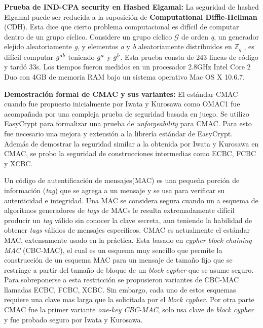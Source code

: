 \documentclass[runningheads]{llncs}
\begin{document}
\textbf{Prueba de \textbf{IND-CPA security} en Hashed Elgamal\cite{ref_article5}:}
La seguridad de hashed Elgamal puede ser reducida a la suposición de \textbf{Computational Diffie-Hellman} (CDH). Esta dice que cierto problema computacional es difícil de computar dentro de un grupo cíclico. Considere un grupo cíclico $\mathcal{G}$ de orden \textit{q}, un generador elejido aleatoriamente \textit{g}, y elementos \textit{a} y \textit{b} aleatoriamente distribuidos en $\mathbb{Z}_q$ , es difícil computar $\mathnormal{g^{ab}}$ teniendo $\mathnormal{g^{a}}$ y $\mathnormal{g^{b}}$. Esta prueba consta de 243 lineas de código y tardó 33s. Los tiempos fueron medidos en un procesador 2.8GHz Intel Core 2 Duo con 4GB de memoria RAM bajo un sistema operativo Mac OS X 10.6.7.



\textbf{Demostración formal de CMAC y sus variantes\cite{ref_article6}:}
El estándar CMAC cuando fue propuesto inicialmente por Iwata y Kurosawa como OMAC1 fue acompañada por una compleja prueba de seguridad basada en juego. Se utilizo EasyCrypt para formalizar una prueba de \textit{unforgeability} para CMAC. Para esto fue necesario una mejora y extensión a la librería estándar de EasyCrypt. Además de demostrar la seguridad similar a la obtenida por Iwata y Kurosawa\cite{ref_article7} en CMAC, se probo la seguridad de construcciones intermedias como ECBC, FCBC y XCBC\cite{ref_article8}.

Un código de autentificación de mensajes(MAC) es una pequeña porción de información (\textit{tag}) que se agrega a un mensaje y se usa para verificar su autenticidad e integridad. Una MAC se considera segura cuando un a esquema de algoritmos generadores de \textit{tags} de MACs le resulta extremadamente difícil producir un \textit{tag} válido sin conocer la clave secreta, aun teniendo la habilidad de obtener \textit{tags} válidos de mensajes específicos. CMAC es actualmente el estándar MAC, extensamente usado en la práctica. Esta basado en \textit{cypher block chaining MAC} (CBC-MAC), el cual es un esquema muy sencillo que permite la construcción de un esquema MAC para un mensaje de tamaño fijo que se restringe a partir del tamaño de bloque de un \textit{block cypher} que se asume seguro. Para sobreponerse a esta restricción se propusieron variantes de CBC-MAC llamadas ECBC, FCBC, XCBC. Sin embargo, cada uno de estos esquemas requiere una clave mas larga que la solicitada por el \textit{block cypher}. Por otra parte CMAC fue la primer variante \textit{one-key CBC-MAC}, solo usa clave de \textit{block cypher} y fue probado seguro por Iwata y Kurosawa.
\end{document}
